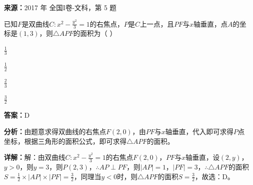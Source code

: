 \begin{question}[points=5]
\textbf{来源：}2017 年 全国I卷-文科，第 5 题\par
已知$F$是双曲线$C:x^2-\frac{y^2}{3}=1$的右焦点，$P$是$C$上一点，且$PF$与$x$轴垂直，点$A$的坐标是$(1,3)$，则$\triangle APF$的面积为（             ）
\begin{choices}
  \item $\frac{1}{3}$
  \item $\frac{1}{2}$
  \item $\frac{2}{3}$
  \item $\frac{3}{2}$
\end{choices}
\begin{solution}
\textbf{答案：}D

\textbf{分析：}由题意求得双曲线的右焦点$F(2,0)$，由$PF$与$x$轴垂直，代入即可求得$P$点坐标，根据三角形的面积公式，即可求得$\triangle APF$的面积。

\textbf{详解：}解：由双曲线$C:x^2-\frac{y^2}{3}=1$的右焦点$F(2,0)$，$PF$与$x$轴垂直，设$(2,y)$，$y>0$，则$y=3$，则$P(2,3)$，$\therefore AP\perp PF$，则$|AP|=1$，$|PF|=3$，$\therefore\triangle APF$的面积$S=\frac{1}{2}\times|AP|\times|PF|=\frac{3}{2}$，同理当$y<0$时，则$\triangle APF$的面积$S=\frac{3}{2}$，故选：D。
\end{solution}
\end{question}

